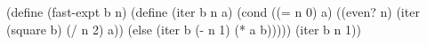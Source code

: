 \begscmtt
(define (fast-expt b n)
  (define (iter b n a)
    (cond ((= n 0) a)
          ((even? n) (iter (square b) (/ n 2) a))
          (else (iter b (- n 1) (* a b)))))
  (iter b n 1))
\endtt
